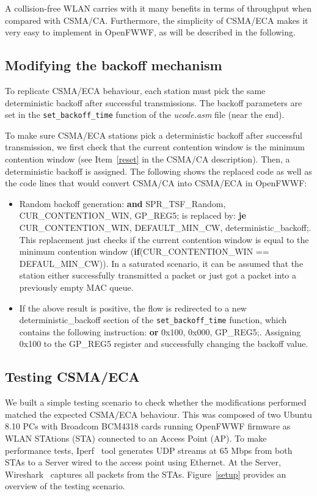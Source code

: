 \documentclass[conference]{IEEEtran}
\begin{document}
A collision-free WLAN carries with it many benefits in terms of throughput when compared with CSMA/CA. Furthermore, the simplicity of CSMA/ECA makes it very easy to implement in OpenFWWF, as will be described in the following.

\subsection{Modifying the backoff mechanism}
To replicate CSMA/ECA behaviour, each station must pick the same deterministic backoff after successful transmissions. The backoff parameters are set in the \texttt{set\_backoff\_time} function of the \emph{ucode.asm} file (near the end).

To make sure CSMA/ECA stations pick a deterministic backoff after successful transmission, we first check that the current contention window is the minimum contention window (see Item~\ref{reset} in the CSMA/CA description). Then, a deterministic backoff is assigned. The following shows the replaced code as well as the code lines that would convert CSMA/CA into CSMA/ECA in OpenFWWF:

\begin{itemize}
	\item Random backoff generation: {\bf and} SPR\_TSF\_Random, CUR\_CONTENTION\_WIN, GP\_REG5; is replaced by: {\bf je} CUR\_CONTENTION\_WIN, DEFAULT\_MIN\_CW, deterministic\_backoff;. \\
	This replacement just checks if the current contention window is equal to the minimum contention window ({\bf if}(CUR\_CONTENTION\_WIN == DEFAUL\_MIN\_CW)). In a saturated scenario, it can be assumed that the station either successfully transmitted a packet or just got a packet into a previously empty MAC queue. 
	\item If the above result is positive, the flow is redirected to a new deterministic\_backoff section of the \texttt{set\_backoff\_time} function, which contains the following instruction: {\bf or} 0x100, 0x000, GP\_REG5;. Assigning 0x100 to the GP\_REG5 register and successfully changing the backoff value.
\end{itemize}

\subsection{Testing CSMA/ECA}
We built a simple testing scenario to check whether the modifications performed matched the expected CSMA/ECA behaviour. This was composed of two Ubuntu 8.10 PCs with Broadcom BCM4318 cards running OpenFWWF firmware as WLAN STAtions (STA) connected to an Access Point (AP). To make performance tests, Iperf~\cite{tirumala2005iperf} tool generates UDP streams at 65 Mbps from both STAs to a Server wired to the access point using Ethernet. At the Server, Wireshark~\cite{combs2007wireshark} captures all packets from the STAs. Figure~\ref{setup} provides an overview of the testing scenario.
\end{document}
